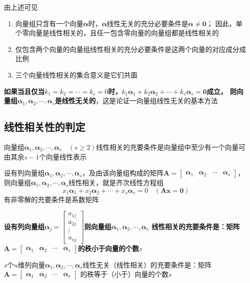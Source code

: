 \documentclass[UTF8]{ctexart}
\newcommand{\ve}[1]{{\bm{#1}}}
\newcommand{\mat}[1]{\ve{#1}}
\newcommand{\emplin}{\vspace{1em}}
\begin{document}
由上述可见
\begin{enumerate}
  \item 向量组只含有一个向量$\mat{\alpha}$时，$\mat{\alpha}$线性无关的充分必要条件是$\mat{\alpha}\ne\mat{0}$；
  因此，单个零向量是线性相关的，且任一包含零向量的向量组都是线性相关的
  \item 仅包含两个向量的向量组线性相关的充分必要条件是这两个向量的对应成分成比例
  \item 三个向量线性相关的集合意义是它们共面
\end{enumerate}

\textbf{如果当且仅当$k_1=k_2=\cdots=k_s=0$时，$k_1\mat{\alpha}_1+k_2\mat{\alpha}_2+\cdots+k_s\mat{\alpha}_s=\mat{0}$成立，
则向量组$\mat{\alpha}_1,\mat{\alpha}_2,\cdots,\mat{\alpha}_s$是线性无关的}，这是论证一向量组线性无关的基本方法

\subsection*{线性相关性的判定}
向量组$\mat{\alpha}_1,\mat{\alpha}_2,\cdots,\mat{\alpha}_s\quad(s\ge2)$线性相关的充要条件是向量组中至少有一个向量可由其余$s-1$个向量线性表示

设有列向量组$\mat{\alpha}_1,\mat{\alpha}_2,\cdots,\mat{\alpha}_s$，及由该向量组构成的矩阵$\mat{A}=\begin{bmatrix}\mat{\alpha}_1&\mat{\alpha}_2&\cdots&\mat{\alpha}_s\end{bmatrix}$，
则向量组$\mat{\alpha}_1,\mat{\alpha}_2,\cdots,\mat{\alpha}_s$线性相关，就是齐次线性方程组
\[x_1\mat{\alpha}_1+x_2\mat{\alpha}_2+\cdots+x_s\mat{\alpha}_s=0\quad(\mat{A}\mat{x}=\mat{0})\]
有非零解的充要条件是系数矩阵

\emplin
\emplin
\emplin

\textbf{设有列向量组$\mat{\alpha}_j=\begin{bmatrix}a_{1j}\\a_{2j}\\\vdots\\a_{nj}\end{bmatrix}$则向量组$\mat{\alpha}_1,\mat{\alpha}_2,\cdots,\mat{\alpha}_s$
线性相关的充要条件是：矩阵$\mat{A}=\begin{bmatrix}\mat{\alpha}_1&\mat{\alpha}_2&\cdots&\mat{\alpha}_s\end{bmatrix}$的秩小于向量的个数$s$}

$s$个$n$维列向量$\mat{\alpha}_1,\mat{\alpha}_2,\cdots,\mat{\alpha}_s$线性无关（线性相关）的充要条件是：矩阵$\mat{A}=\begin{bmatrix}\mat{\alpha}_1&\mat{\alpha}_2&\cdots&\mat{\alpha}_s\end{bmatrix}$
的秩等于（小于）向量的个数$s$
\end{document}
